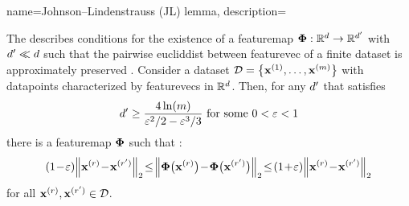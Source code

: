 {name={Johnson--Lindenstrauss (JL) lemma},
  description={The  describes conditions for 
  the existence of a \gls{featuremap} ${\bf \Phi}: \mathbb{R}^{d} \to \mathbb{R}^{d'}$ 
  with $d' \ll d$ such that the pairwise \gls{eucliddist} 
  between \gls{featurevec} of a finite \gls{dataset} is approximately preserved 
  \cite{vershynin2018high,JMLR:v19:18-264,johnson1984extensions}. 
  Consider a \gls{dataset} $\mathcal{D} = \big\{{\bf x}^{(1)}, \dots, {\bf x}^{(m)} \big\}$ 
  with \glspl{datapoint} characterized by \glspl{featurevec} in $\mathbb{R}^{d}$. 
  Then, for any $d'$ that satisfies
	\[
	  d' \ge \frac{4 \ln(m)}{\varepsilon^2/2 - \varepsilon^3/3} \mbox{ for some } 0 < \varepsilon < 1
	\]  
   there is a \gls{featuremap} ${\bf \Phi}$ such that \cite{ProofJLlemma}: 
   \begin{equation} 
 		\label{equ_def_approx_norm_JL_lemma_dict}
 		(1\!-\!\varepsilon)\normgeneric{\featurevec^{(\sampleidx)}\!-\!\featurevec^{(\sampleidx')}}{2}  
 		\!\le\!\normgeneric{\featuremapvec\big(\featurevec^{(\sampleidx)}\big)\!-\!\featuremapvec\big(\featurevec^{(\sampleidx')}\big)}{2} 
		\!\le\!(1\!+\!\varepsilon)\normgeneric{\featurevec^{(\sampleidx)}\!-\!\featurevec^{(\sampleidx')}}{2}
 	\end{equation}
	for all ${\bf x}^{(r)}, {\bf x}^{(r')} \in \mathcal{D}$. 
	\begin{figure}[hbtp]
		\centering
\end{figure}}}
